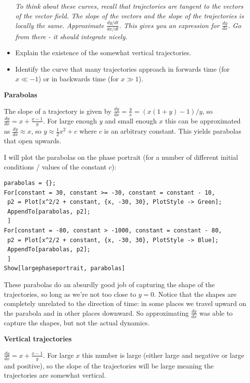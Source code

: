 \documentclass[12pt,letterpaper]{exam}
\begin{document}
\begin{questions}
\begin{parts}
\begin{itemize}
    \emph{To think about these curves, recall that trajectories are tangent to the vectors of the vector field.  The slope of the vectors and the slope of the trajectories is locally the same. Approximate $\displaystyle\frac{dy/dt}{dx/dt}$.  This gives you an expression for $\displaystyle\frac{dy}{dx}$. Go from there - it should integrate nicely.}
    
    \item Explain the existence of the somewhat vertical trajectories.
    
    \item Identify the curve that many trajectories approach in forwards time (for $x\ll -1$) or in backwards time (for $x\gg 1$). 
\end{itemize}

\begin{solution}

\textbf{Parabolas}

The slope of a trajectory is given by $\frac{dy}{dx} = \frac{\dot{y}}{\dot{x}}  = (x(1+y) - 1)/y$, so $\frac{dy}{dx} = x + \frac{x-1}{y}$.  For large enough $y$ and small enough $x$ this can be approximated as $\frac{dy}{dx}\approx x$, so $y \approx \frac{1}{2} x^2 + c$ where $c$ is an arbitrary constant.  This yields parabolas that open upwards.


I will plot the parabolas on the phase portrait (for a number of different initial conditions / values of the constant $c$):
\begin{verbatim}
parabolas = {};
For[constant = 30, constant >= -30, constant = constant - 10,
 p2 = Plot[x^2/2 + constant, {x, -30, 30}, PlotStyle -> Green];
 AppendTo[parabolas, p2];
 ]
For[constant = -80, constant > -1000, constant = constant - 80,
 p2 = Plot[x^2/2 + constant, {x, -30, 30}, PlotStyle -> Blue];
 AppendTo[parabolas, p2];
 ]
Show[largephaseportrait, parabolas]
\end{verbatim}


These parabolas do an absurdly good job of capturing the shape of the trajectories, so long as we're not too close to $y = 0$.  Notice that the shapes are completely unrelated to the direction of time: in some places we travel upward on the parabola and in other places downward.  So approximating $\frac{dy}{dx}$ was able to capture the shapes, but not the actual dynamics.


\textbf{Vertical trajectories}

$\frac{dy}{dx} = x + \frac{x-1}{y}$.  For large $x$ this number is large (either large and negative or large and positive), so the slope of the trajectories will be large meaning the trajectories are somewhat vertical.


\end{solution}
\end{parts}
\end{questions}
\end{document}
